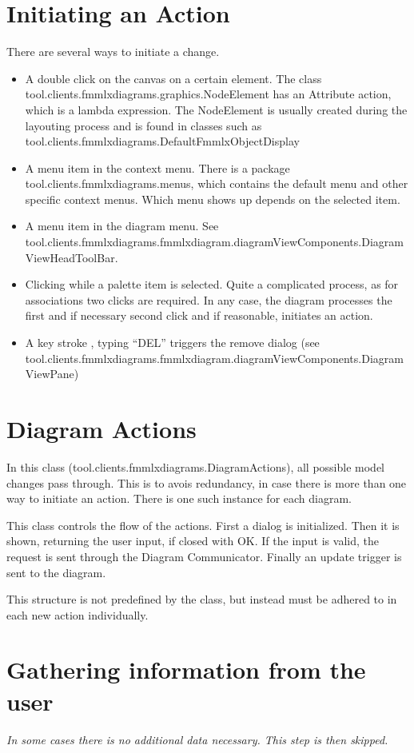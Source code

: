 \documentclass [11pt,letterpaper,twoside,openright]{book}
\begin{document}
\section{Initiating an Action}
There are several ways to initiate a change. 
\begin{itemize}
	\item A double click on the canvas on a certain element. The class tool.clients.fmmlxdiagrams.graphics.NodeElement has an Attribute action, which is a lambda expression. The NodeElement is usually created during the layouting process and is found in classes such as tool.clients.fmmlxdiagrams.DefaultFmmlxObjectDisplay
	\item A menu item in the context menu. There is a package tool.clients.fmmlxdiagrams.menus, which contains the default menu and other specific context menus. Which menu shows up depends on the selected item.
	\item A menu item in the diagram menu. See tool.clients.fmmlxdiagrams.fmmlxdiagram.diagramViewComponents.DiagramViewHeadToolBar.
	\item Clicking while a palette item is selected. Quite a complicated process, as for associations two clicks are required. In any case, the diagram processes the first and if necessary second click and if reasonable, initiates an action.
	\item A key stroke , typing ``DEL'' triggers the remove dialog (see tool.clients.fmmlxdiagrams.fmmlxdiagram.diagramViewComponents.DiagramViewPane)
\end{itemize}

\section{Diagram Actions}
In this class (tool.clients.fmmlxdiagrams.DiagramActions), all possible model changes pass through. This is to avois redundancy, in case there is more than one way to initiate an action. There is one such instance for each diagram. 

This class controls the flow of the actions. First a dialog is initialized. Then it is shown, returning the user input, if closed with OK. If the input is valid, the request is sent through the Diagram Communicator. Finally an update trigger is sent to the diagram.

This structure is not predefined by the class, but instead must be adhered to in each new action individually.

\section{Gathering information from the user}
\textit{In some cases there is no additional data necessary. This step is then skipped.}
\end{document}

